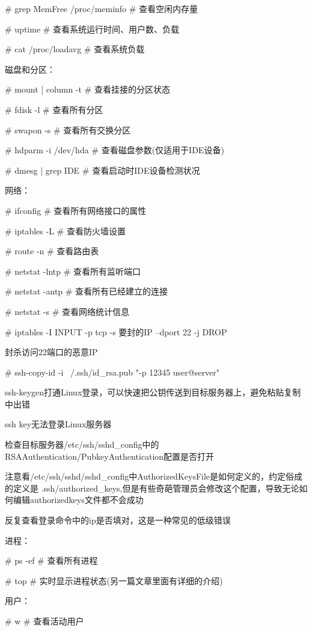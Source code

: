 \# grep MemFree /proc/meminfo \# 查看空闲内存量

\# uptime \# 查看系统运行时间、用户数、负载

\# cat /proc/loadavg \# 查看系统负载

磁盘和分区：

\# mount | column -t \# 查看挂接的分区状态

\# fdisk -l \# 查看所有分区

\# swapon -s \# 查看所有交换分区

\# hdparm -i /dev/hda \# 查看磁盘参数(仅适用于IDE设备)

\# dmesg | grep IDE \# 查看启动时IDE设备检测状况

网络：

\# ifconfig \# 查看所有网络接口的属性

\# iptables -L \# 查看防火墙设置

\# route -n \# 查看路由表

\# netstat -lntp \# 查看所有监听端口

\# netstat -antp \# 查看所有已经建立的连接

\# netstat -s \# 查看网络统计信息

\# iptables -I INPUT -p tcp -s 要封的IP --dport 22 -j DROP

封杀访问22端口的恶意IP

\# ssh-copy-id -i ~/.ssh/id\_rsa.pub "-p 12345 user@server"

ssh-keygen打通Linux登录，可以快速把公钥传送到目标服务器上，避免粘贴复制中出错

ssh key无法登录Linux服务器\cite{linux_wiki}

\begin{compactenum}
\item 检查目标服务器/etc/ssh/sshd\_config中的RSAAuthentication/PubkeyAuthentication配置是否打开
\item 注意看/etc/ssh/sshd/sshd\_config中AuthorizedKeysFile是如何定义的，约定俗成的定义是 .ssh/authorized\_keys,但是有些奇葩管理员会修改这个配置，导致无论如何编辑authorizedkeys文件都不会成功
\item 反复查看登录命令中的ip是否填对，这是一种常见的低级错误
\end{compactenum}

进程：

\# ps -ef \# 查看所有进程

\# top \# 实时显示进程状态(另一篇文章里面有详细的介绍)

用户：

\# w \# 查看活动用户

